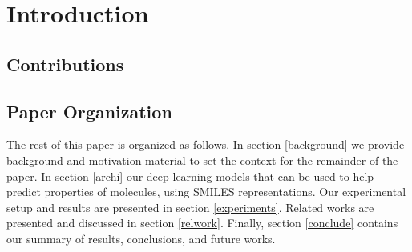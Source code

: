 \section{Introduction \label{intro}}

\subsection{Contributions}
\subsection{Paper Organization}
The rest of this paper is organized as follows. In section \ref{background} we provide background and motivation material to set the context for the remainder of the paper. In section \ref{archi} our deep learning models that can be used to help predict properties of molecules, using SMILES representations. Our experimental setup and results are presented in section \ref{experiments}. Related works are presented and discussed in section \ref{relwork}. Finally, section \ref{conclude} contains our summary of results, conclusions, and future works.
